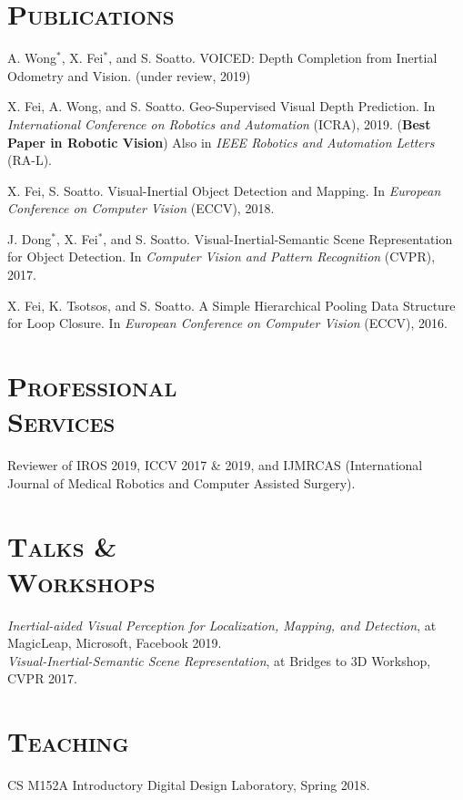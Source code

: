 \documentclass[margin, line, 10pt]{res} %
\begin{document}
\begin{resume}
\section{\textsc{Publications}}

\begin{enumerate}[label={[\bf\arabic*]},leftmargin=*]
\item
A. Wong$^*$, X. Fei$^*$, and S. Soatto. VOICED: Depth Completion from Inertial Odometry and Vision. (under review, 2019)
\item 
X. Fei, A. Wong, and S. Soatto. Geo-Supervised Visual Depth Prediction. 
In \textit{International Conference on Robotics and Automation} (ICRA), 2019. 
(\textbf{Best Paper in Robotic Vision})
Also in \textit{IEEE Robotics and Automation Letters} (RA-L).
\item 
X. Fei, S. Soatto. Visual-Inertial Object Detection and Mapping. 
In \textit{European Conference on Computer Vision} (ECCV), 2018.
\item 
J. Dong$^*$, X. Fei$^*$, and S. Soatto. Visual-Inertial-Semantic Scene Representation for Object Detection. 
In \textit{Computer Vision and Pattern Recognition} (CVPR), 2017.
\item 
X. Fei, K. Tsotsos, and S. Soatto. A Simple Hierarchical Pooling Data Structure for Loop Closure. 
In \textit{European Conference on Computer Vision} (ECCV), 2016.
\end{enumerate}

\section{\textsc{Professional\\Services}}
Reviewer of IROS 2019, ICCV 2017 \& 2019, and IJMRCAS (International Journal of Medical Robotics and Computer Assisted Surgery).

\section{\textsc{Talks \&\\Workshops}}
\textit{Inertial-aided Visual Perception for Localization, Mapping, and Detection}, at MagicLeap, Microsoft, Facebook 2019.\\
\textit{Visual-Inertial-Semantic Scene Representation}, at Bridges to 3D Workshop, CVPR 2017.

\section{\textsc{Teaching}}
CS M152A Introductory Digital Design Laboratory, Spring 2018.


\end{resume}
\end{document}
